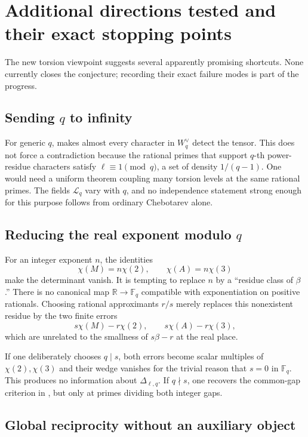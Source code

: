 \documentclass[11pt]{article}
\numberwithin{equation}{section}
\theoremstyle{definition}
\theoremstyle{remark}
\newcommand{\F}{\mathbb F}
\begin{document}
\section{Additional directions tested and their exact stopping points}
\label{sec:attempts}

The new torsion viewpoint suggests several apparently promising shortcuts.  None currently
closes the conjecture; recording their exact failure modes is part of the progress.

\subsection{Sending \texorpdfstring{\(q\)}{q} to infinity}

For generic \(q\),  makes almost every character in \(W_q^\vee\)
detect the tensor.  This does not force a contradiction because the rational primes that
support \(q\)-th power-residue characters satisfy \(\ell\equiv1\pmod q\), a set of density
\(1/(q-1)\).  One would need a uniform theorem coupling many torsion levels at the same
rational primes.  The fields \(\mathcal L_q\) vary with \(q\), and no independence statement
strong enough for this purpose follows from ordinary Chebotarev alone.

\subsection{Reducing the real exponent modulo \texorpdfstring{\(q\)}{q}}

For an integer exponent \(n\), the identities
\[
 \chi(M)=n\chi(2),\qquad \chi(A)=n\chi(3)
\]
make the determinant vanish.  It is tempting to replace \(n\) by a ``residue class of
\(\beta\).''  There is no canonical map \(\mathbb R\to\F_q\) compatible with
exponentiation on positive rationals.  Choosing rational approximants \(r/s\) merely replaces
this nonexistent residue by the two finite errors
\[
 s\chi(M)-r\chi(2),\qquad s\chi(A)-r\chi(3),
\]
which are unrelated to the smallness of \(s\beta-r\) at the real place.

If one deliberately chooses \(q\mid s\), both errors become scalar multiples of
\(\chi(2),\chi(3)\) and their wedge vanishes for the trivial reason that \(s=0\) in
\(\F_q\).  This produces no information about \(\Delta_{\ell,q}\).  If \(q\nmid s\), one
recovers the common-gap criterion in , but only at primes dividing both
integer gaps.

\subsection{Global reciprocity without an auxiliary object}
\end{document}
